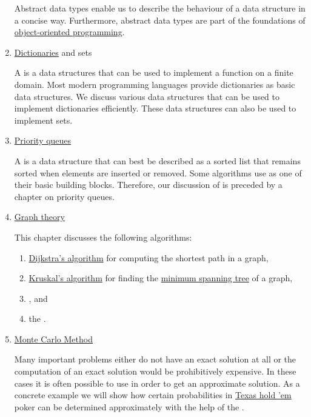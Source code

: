 \begin{enumerate}
      Abstract data types enable us to describe the behaviour of a data structure in a concise way.
      Furthermore, abstract data types are part of the foundations of 
      \href{https://en.wikipedia.org/wiki/Object-oriented_programming}{object-oriented programming}. 
%  

\item \href{http://en.wikipedia.org/wiki/Map_(computer_science)}{Dictionaries} and sets
  
      A  is a data structures that can be used to implement a function on a finite domain.
      Most modern programming languages provide dictionaries as basic data structures.  We discuss various data
      structures that can be used to implement dictionaries efficiently.   
      These data structures can also be used to implement sets.
\item \href{http://en.wikipedia.org/wiki/Priority_queue}{Priority queues}

      A  is a data structure that can best be described as a sorted list that remains
      sorted when elements are inserted or removed.
      Some  algorithms use  as one of their basic building blocks.
      Therefore, our discussion of  is preceded by a chapter on priority queues.
\item \href{http://en.wikipedia.org/wiki/Graph_theory}{Graph theory}
  
      This chapter discusses the following algorithms:
      \begin{enumerate}
      \item \href{http://en.wikipedia.org/wiki/Dijkstra%27s_algorithm}{Dijkstra's algorithm}
            for computing the shortest path in a graph,
      \item \href{https://en.wikipedia.org/wiki/Kruskal%27s_algorithm}{Kruskal's algorithm} for finding the
            \href{https://en.wikipedia.org/wiki/Minimum_spanning_tree}{minimum spanning tree} of a graph,
      \item {}, and 
      \item the .
      \end{enumerate}
\item \href{http://en.wikipedia.org/wiki/Monte_Carlo_method}{Monte Carlo Method} 
 
      Many important problems either do not have an exact solution at all or the computation of an
      exact solution would be prohibitively expensive.  In these cases it is often possible to use 
       in order to get an approximate solution.  As a concrete example we will show
      how certain probabilities in \href{http://en.wikipedia.org/wiki/Texas_hold_%27em}{Texas hold 'em} 
      poker can be determined approximately with the help of the .
\end{enumerate}
